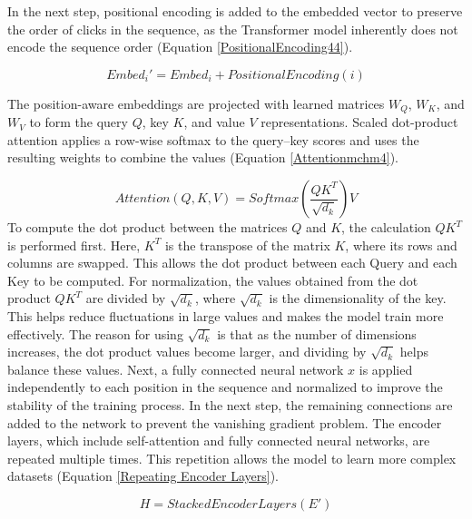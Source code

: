 \documentclass[sn-mathphys-num, Numbered]{sn-jnl}%
\theoremstyle{thmstyleone}%
\theoremstyle{thmstyletwo}%
\theoremstyle{thmstylethree}%
\begin{document}
In the next step, positional encoding is added to the embedded vector to preserve the order of clicks in the sequence, as the Transformer model inherently does not encode the sequence order (Equation \ref{PositionalEncoding44}).

\begin{equation}\label{PositionalEncoding44}
	Embed_i' = Embed_i + {PositionalEncoding}(i)
\end{equation}

\smallskip
The position-aware embeddings are projected with learned matrices \(W_Q\), \(W_K\), and \(W_V\) to form the query \(Q\), key \(K\), and value \(V\) representations. Scaled dot-product attention applies a row-wise softmax to the query--key scores and uses the resulting weights to combine the values (Equation \ref{Attentionmchm4}).

\begin{equation}\label{Attentionmchm4}
	Attention (Q, K, V) = {Softmax}\left(\frac{QK^T}{\sqrt{d_k}}\right) V
\end{equation}
\smallskip
To compute the dot product between the matrices $Q$ and $K$, the calculation \( QK^T \) is performed first. Here, \( K^T \) is the transpose of the matrix \( K \), where its rows and columns are swapped. This allows the dot product between each Query and each Key to be computed.
For normalization, the values obtained from the dot product \( QK^T \) are divided by \( \sqrt{d_k} \), where \( \sqrt{d_k} \) is the dimensionality of the key. This helps reduce fluctuations in large values and makes the model train more effectively. The reason for using \( \sqrt{d_k} \) is that as the number of dimensions increases, the dot product values become larger, and dividing by \( \sqrt{d_k} \) helps balance these values.
Next, a fully connected neural network $x$ is applied independently to each position in the sequence and normalized to improve the stability of the training process.
In the next step, the remaining connections are added to the network to prevent the vanishing gradient problem. The encoder layers, which include self-attention and fully connected neural networks, are repeated multiple times. This repetition allows the model to learn more complex datasets (Equation \ref{Repeating Encoder Layers}).

\begin{equation}\label{Repeating Encoder Layers}
	H = {StackedEncoderLayers}(E')
\end{equation}
\end{document}
